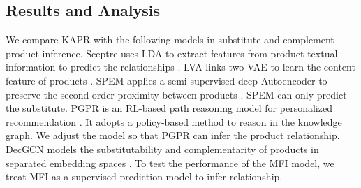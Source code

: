 \documentclass[review]{elsarticle}
\begin{document}
\begin{sloppypar}
\subsection{Results and Analysis}
We compare KAPR with the following models in substitute and complement product inference. 
Sceptre uses LDA to extract features from product textual information to predict the relationships \cite{mcauley2015inferringSceptre}. 
LVA links two VAE to learn the content feature of products \cite{rakesh2019LVAE}.
SPEM applies a semi-supervised deep Autoencoder to preserve the second-order proximity between products \cite{zhang2019inferring_SPEM}. SPEM can only predict the substitute. 
PGPR is an RL-based path reasoning model for personalized recommendation \cite{xian2019reinforcement}. It adopts a policy-based method to reason in the knowledge graph. We adjust the model so that PGPR can infer the product relationship. 
DecGCN models the substitutability and complementarity of products in separated embedding spaces \cite{DecGCN}.
To test the performance of the MFI model, we treat MFI as a supervised prediction model to infer relationship.


\end{sloppypar}
\end{document}
